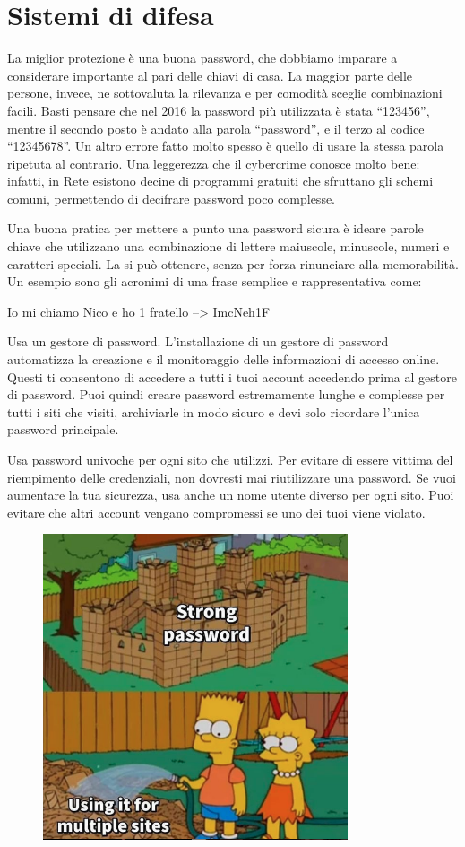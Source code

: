 \section{Sistemi di difesa}

La miglior protezione è una buona password, che dobbiamo imparare a considerare importante al pari delle chiavi di casa. La maggior parte delle persone, invece, ne sottovaluta la rilevanza e per comodità sceglie combinazioni facili. Basti pensare che nel 2016 la password più utilizzata è stata “123456”, mentre il secondo posto è andato alla parola “password”, e il terzo al codice “12345678”. Un altro errore fatto molto spesso è quello di usare la stessa parola ripetuta al contrario. Una leggerezza che il cybercrime conosce molto bene: infatti, in Rete esistono decine di programmi gratuiti che sfruttano gli schemi comuni, permettendo di decifrare password poco complesse.

Una buona pratica per mettere a punto una password sicura è ideare parole chiave che utilizzano una combinazione di lettere maiuscole, minuscole, numeri e caratteri speciali. La si può ottenere, senza per forza rinunciare alla memorabilità. Un esempio sono gli acronimi di una frase semplice e rappresentativa come:

\medskip

Io mi chiamo Nico e ho 1 fratello  -->  ImcNeh1F

\medskip

Usa un gestore di password. L'installazione di un gestore di password automatizza la creazione e il monitoraggio delle informazioni di accesso online. Questi ti consentono di accedere a tutti i tuoi account accedendo prima al gestore di password. Puoi quindi creare password estremamente lunghe e complesse per tutti i siti che visiti, archiviarle in modo sicuro e devi solo ricordare l'unica password principale.

Usa password univoche per ogni sito che utilizzi. Per evitare di essere vittima del riempimento delle credenziali, non dovresti mai riutilizzare una password. Se vuoi aumentare la tua sicurezza, usa anche un nome utente diverso per ogni sito. Puoi evitare che altri account vengano compromessi se uno dei tuoi viene violato.
\begin{figure}[ht]
    \centering
    \includegraphics[width=90mm]{Immagini/9/simpson.png}
\end{figure}

